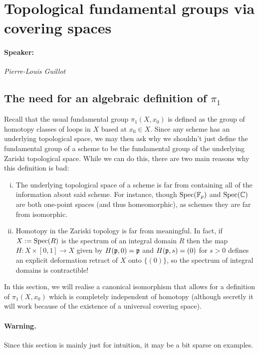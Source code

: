 \section{Topological fundamental groups via covering spaces}
\label{sec:3_pi_1_as_Aut(Fib)}
\paragraph{Speaker:} \emph{Pierre-Louis Guillot}
\subsection{The need for an algebraic definition of \texorpdfstring{$\pi_1$}{π1}}
\label{subsec:3_1_why_Zariski_sucks}
Recall that the usual fundamental group $\pi_1(X,x_0)$ is defined as the group of homotopy classes of loops in $X$ based at $x_0 \in X$. Since any scheme has an underlying topological space, we may then ask why we shouldn't just define the fundamental group of a scheme to be the fundamental group of the underlying Zariski topological space. While we can do this, there are two main reasons why this definition is bad:

\begin{enumerate}[(i)]
	\item The underlying topological space of a scheme is far from containing all of the information about said scheme. For instance, though $\mathrm{Spec}(\mathbb{F}_p)$ and $\mathrm{Spec}(\mathbb{C})$ are both one-point spaces (and thus homeomorphic), as schemes they are far from isomorphic.
	\item Homotopy in the Zariski topology is far from meaningful. In fact, if $X:=\mathrm{Spec}(R)$ is the spectrum of an integral domain $R$ then the map $H:X \times [0,1] \to X$ given by $H(\mathfrak{p}, 0) = \mathfrak{p}$ and $H(\mathfrak{p}, s) = (0)$ for $s >0$ defines an explicit deformation retract of $X$ onto $\{(0)\}$, so the spectrum of integral domains is contractible! %
\end{enumerate}

In this section, we will realise a canonical isomorphism that allows for a definition of $\pi_1(X,x_0)$ which is completely independent of homotopy (although secretly it will work because of the existence of a universal covering space).

\paragraph{Warning.} Since this section is mainly just for intuition, it may be a bit sparse on examples.


